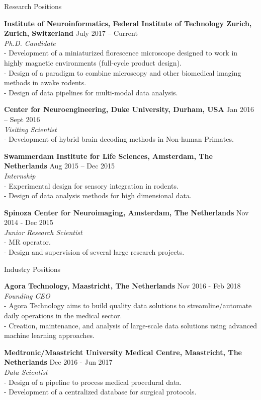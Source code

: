 \documentclass{resume}
\begin{document}
\begin{sections}{Research Positions}

{\bf Institute of Neuroinformatics, Federal Institute of Technology Zurich, Zurich, Switzerland} \hfill {July 2017 – Current}
\\{\textit{Ph.D. Candidate}}
\\- Development of a miniaturized florescence microscope designed to work in highly magnetic environments (full-cycle product design).
\\- Design of a paradigm to combine microscopy and other biomedical imaging methods in awake rodents.
\\- Design of data pipelines for multi-modal data analysis.

{\bf Center for Neuroengineering, Duke University, Durham, USA} \hfill {Jan 2016 – Sept 2016}
\\{\textit{Visiting Scientist}}
\\- Development of hybrid brain decoding methods in Non-human Primates.

{\bf Swammerdam Institute for Life Sciences, Amsterdam, The Netherlands} \hfill {Aug 2015 – Dec 2015}
\\{\textit{Internship}}
\\- Experimental design for sensory integration in rodents.
\\- Design of data analysis methods for high dimensional data.

{\bf Spinoza Center for Neuroimaging, Amsterdam, The Netherlands} \hfill {Nov 2014 - Dec 2015}
\\{\textit{Junior Research Scientist}}
\\- MR operator.
\\- Design and supervision of several large research projects.

\end{sections}

\cleardoublepage

\begin{sections}{Industry Positions}

{\bf Agora Technology, Maastricht, The Netherlands} \hfill {Nov 2016 - Feb 2018}
\\{\textit{Founding CEO}}
\\- Agora Technology aims to build quality data solutions to streamline/automate daily operations in the medical sector.
\\- Creation, maintenance, and analysis of large-scale data solutions using advanced machine learning approaches.

{\bf Medtronic/Maastricht University Medical Centre, Maastricht, The Netherlands} \hfill {Dec 2016 - Jun 2017}
\\{\textit{Data Scientist}}
\\- Design of a pipeline to process medical procedural data.
\\- Development of a centralized database for surgical protocols.

\end{sections}
\end{document}
